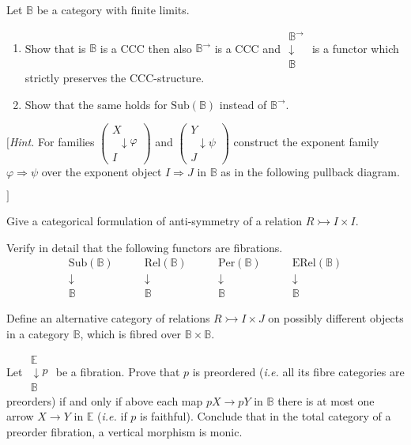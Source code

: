 \documentclass{report}
\newcommand{\bE}[0]{\mathbb E}
\newcommand{\bB}[0]{\mathbb B}
\newcommand{\fib}[3]{\begin{array}{l}#1 \\[-0.1cm] \downarrow #2 \\ #3\end{array}}
\newcommand{\fibcent}[3]{\begin{array}{c}#1 \\[-0.1cm] \;\;\downarrow #2 \\ #3\end{array}}
\newcommand{\fibcentt}[2]{\begin{array}{c}#1 \\[-0.1cm] \downarrow \\ #2\end{array}}
\newcommand{\fibPEB}[0]{\fib{\bE}{p}{\bB}}
\newcommand{\Sub}[0]{\mathrm{Sub}}
\newcommand{\Rel}[0]{\mathrm{Rel}}
\newcommand{\Per}[0]{\mathrm{Per}}
\newcommand{\ERel}[0]{\mathrm{ERel}}
\begin{document}
\begin{exo}
    Let $\bB$ be a category with finite limits.
    \begin{enumerate}[label=(\roman*)]
        \item Show that is $\bB$ is a CCC then also $\bB^\to$ is a CCC and $\fib{\bB^\to}{}{\bB}$ is a functor
        which strictly preserves the CCC-structure.
        \item Show that the same holds for $\Sub(\bB)$ instead of $\bB^\to$.
    \end{enumerate}
    $[$\textit{Hint.} For families $\left(\fibcent{X}{\varphi}{I}\right)$ and
    $\left(\fibcent{Y}{\psi}{J}\right)$ construct the exponent family $\varphi\Rightarrow \psi$ over the
    exponent object $I\Rightarrow J$ in $\bB$ as in the following pullback diagram.
    \begin{center}
    \end{center}
    \vspace{-1.1cm}
    \begin{flushright}
        $]$
    \end{flushright}
\end{exo}

\begin{exo}
    Give a categorical formulation of anti-symmetry of a relation $R\rightarrowtail I\times I$.
\end{exo}

\begin{exo}
    Verify in detail that the following functors are fibrations.
    $$\fibcentt{\Sub(\bB)}{\bB}\qquad\fibcentt{\Rel(\bB)}{\bB}\qquad \fibcentt{\Per(\bB)}{\bB}
    \qquad \fibcentt{\ERel(\bB)}{\bB}$$
\end{exo}

\begin{exo}
    Define an alternative category of relations $R\rightarrowtail I\times J$ on possibly different objects
    in a category $\bB$, which is fibred over $\bB\times\bB$.
\end{exo}

\begin{exo}
    Let $\fibPEB$ be a fibration. Prove that $p$ is preordered (\textit{i.e.} all its fibre categories are
    preorders) if and only if above each map $pX\to pY$ in $\bB$ there is at most one arrow $X\to Y$ in $\bE$
    (\textit{i.e.} if $p$ is faithful). Conclude that in the total category of a preorder fibration, a
    vertical morphism is monic.
\end{exo}
\end{document}
